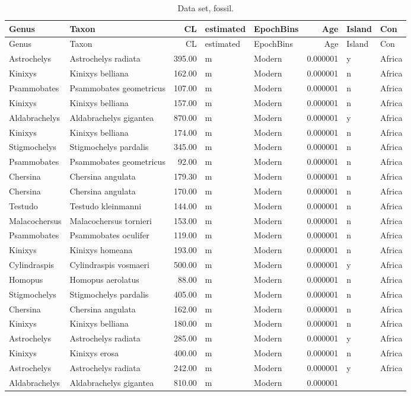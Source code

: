 \begin{landscape}

\begin{longtable}[]{@{}llrllrll@{}}
	\caption{Data set, fossil.}
	\label{tab:DataFossil}\tabularnewline
	\toprule
	Genus & Taxon & CL & estimated & EpochBins & Age & Island &
	Con\tabularnewline
	\midrule
	\endfirsthead
	\toprule
	Genus & Taxon & CL & estimated & EpochBins & Age & Island &
	Con\tabularnewline
	\midrule
	\endhead
	Astrochelys & Astrochelys radiata & 395.00 & m & Modern & 0.000001 & y &
	Africa\tabularnewline
	Kinixys & Kinixys belliana & 162.00 & m & Modern & 0.000001 & n &
	Africa\tabularnewline
	Psammobates & Psammobates geometricus & 107.00 & m & Modern & 0.000001 &
	n & Africa\tabularnewline
	Kinixys & Kinixys belliana & 157.00 & m & Modern & 0.000001 & n &
	Africa\tabularnewline
	Aldabrachelys & Aldabrachelys gigantea & 870.00 & m & Modern & 0.000001
	& y & Africa\tabularnewline
	Kinixys & Kinixys belliana & 174.00 & m & Modern & 0.000001 & n &
	Africa\tabularnewline
	Stigmochelys & Stigmochelys pardalis & 345.00 & m & Modern & 0.000001 &
	n & Africa\tabularnewline
	Psammobates & Psammobates geometricus & 92.00 & m & Modern & 0.000001 &
	n & Africa\tabularnewline
	Chersina & Chersina angulata & 179.30 & m & Modern & 0.000001 & n &
	Africa\tabularnewline
	Chersina & Chersina angulata & 170.00 & m & Modern & 0.000001 & n &
	Africa\tabularnewline
	Testudo & Testudo kleinmanni & 144.00 & m & Modern & 0.000001 & n &
	Africa\tabularnewline
	Malacochersus & Malacochersus tornieri & 153.00 & m & Modern & 0.000001
	& n & Africa\tabularnewline
	Psammobates & Psammobates oculifer & 119.00 & m & Modern & 0.000001 & n
	& Africa\tabularnewline
	Kinixys & Kinixys homeana & 193.00 & m & Modern & 0.000001 & n &
	Africa\tabularnewline
	Cylindraspis & Cylindraspis vosmaeri & 500.00 & m & Modern & 0.000001 &
	y & Africa\tabularnewline
	Homopus & Homopus aerolatus & 88.00 & m & Modern & 0.000001 & n &
	Africa\tabularnewline
	Stigmochelys & Stigmochelys pardalis & 405.00 & m & Modern & 0.000001 &
	n & Africa\tabularnewline
	Chersina & Chersina angulata & 162.00 & m & Modern & 0.000001 & n &
	Africa\tabularnewline
	Kinixys & Kinixys belliana & 180.00 & m & Modern & 0.000001 & n &
	Africa\tabularnewline
	Astrochelys & Astrochelys radiata & 285.00 & m & Modern & 0.000001 & y &
	Africa\tabularnewline
	Kinixys & Kinixys erosa & 400.00 & m & Modern & 0.000001 & n &
	Africa\tabularnewline
	Astrochelys & Astrochelys radiata & 242.00 & m & Modern & 0.000001 & y &
	Africa\tabularnewline
	Aldabrachelys & Aldabrachelys gigantea & 810.00 & m & Modern & 0.000001

\end{longtable}
\end{landscape}
